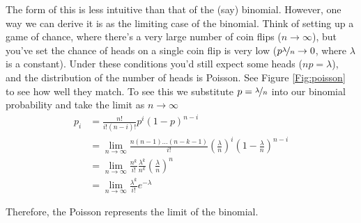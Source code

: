 \begin{description}
 The form of this is less intuitive than that of the (say)
 binomial. However, one way we can derive it is as the limiting case of the
 binomial. Think of setting up a game of chance, where there's a very large number of coin
 flips ($n \rightarrow \infty$), but you've set the chance of heads on a single
 coin flip is very low ($p  \nicefrac{\lambda}{n} \rightarrow 0$,
 where $\lambda$ is a constant).  Under these conditions you'd still
 expect some heads ($np =\lambda$), and the distribution of the number
 of heads is Poisson. See Figure \ref{Fig:poisson} to see how well
 they match. To see this we substitute
 $p=\nicefrac{\lambda}{n}$ into our binomial probability and take
 the limit as $n \to \infty$ 
 \begin{align}
   p_i &= \frac{n!}{i!(n-i)!} p^i (1-p)^{n-i} \nonumber\\
         &= \lim_{n\to\infty} \frac{n(n-1)\ldots
         (n-k-1)}{i!} \left(  \frac{\lambda}{n}\right)^i \left(1-
         \frac{\lambda}{n}\right)^{n-i} \nonumber\\
   & = \lim_{n\to\infty} \frac{n^k}{i!} \frac{\lambda^k}{n^k} \left(
     \frac{\lambda}{n}\right)^n \nonumber\\
 &=  \lim_{n\to\infty} \frac{\lambda^k}{i!} e^{-\lambda}
 \end{align}
 \end{description}
Therefore, the Poisson represents the limit of
the binomial. 
